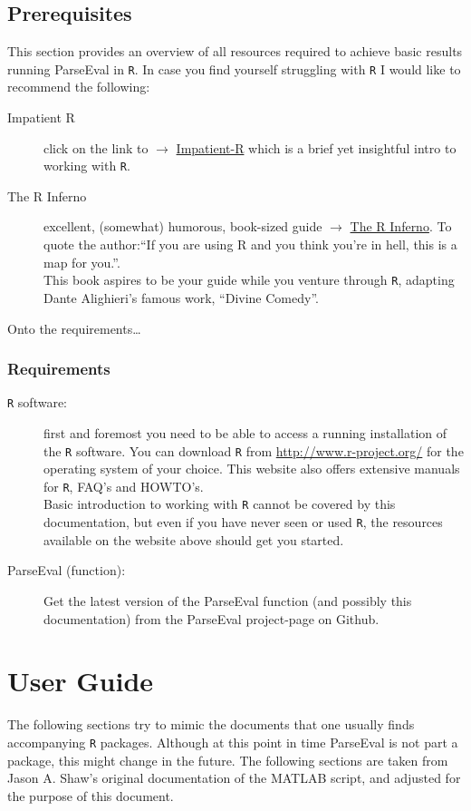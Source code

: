 \documentclass[
draft=false,
toc=graduated,
listof=totoc,
headsepline=true,
]%
{scrartcl}
\begin{document}
\subsection{Prerequisites}
This section provides an overview of all resources required to achieve basic results running ParseEval in \texttt{R}. In case you find yourself struggling with \texttt{R} I would like to recommend the following:
\begin{description}
\item[Impatient R] click on the link to $\rightarrow$ \href{http://www.burns-stat.com/documents/tutorials/impatient-r/}{Impatient-R} which is a brief yet insightful intro to working with \texttt{R}.
\item[The R Inferno] excellent, (somewhat) humorous, book-sized guide $\rightarrow$ \href{http://www.burns-stat.com/documents/books/the-r-inferno/}{The R Inferno}. To quote the author:\enquote{If you are using R and you think you're in hell, this is a map for you.}.\\
This book aspires to be your guide while you venture through \texttt{R}, adapting Dante Alighieri's famous work, \enquote{Divine Comedy}.
\end{description}
Onto the requirements\dots{}
\subsubsection*{Requirements}
\begin{description}
\item[\texttt{R} software:] first and foremost you need to be able to access a running installation of the \texttt{R} software. You can download \texttt{R} from \url{http://www.r-project.org/} for the operating system of your choice. This website also offers extensive manuals for \texttt{R}, FAQ's and HOWTO's.\\%
Basic introduction to working with \texttt{R} cannot be covered by this documentation, but even if you have never seen or used \texttt{R}, the resources available on the website above should get you started.
\item[ParseEval (function):] Get the latest version of the ParseEval function (and possibly this documentation) from the ParseEval project-page on Github.
\end{description}
\newpage
\section{User Guide}
\label{sec:guide}
The following sections try to mimic the documents that one usually finds accompanying \texttt{R} packages. Although at this point in time ParseEval is not part a package, this might change in the future. The following sections are taken from Jason A. Shaw's original documentation of the MATLAB script, and adjusted for the purpose of this document.
\end{document}
